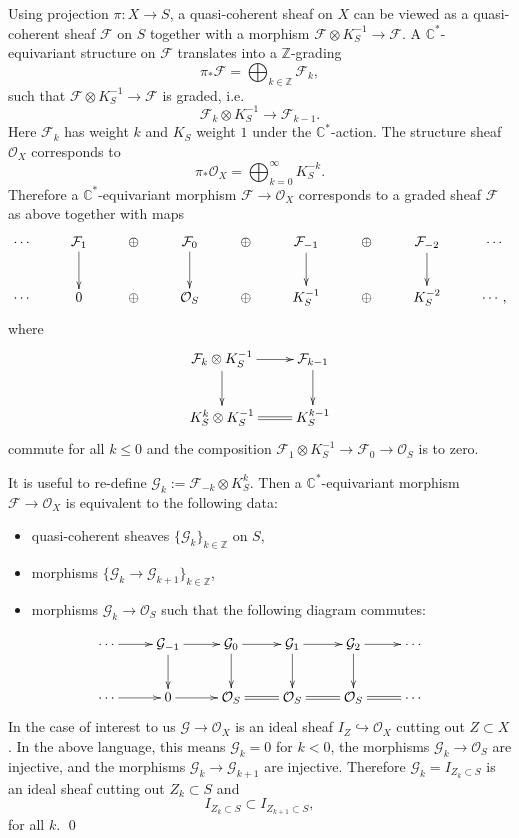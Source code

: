 \documentclass{amsart}
\theoremstyle{definition}
\newcommand{\CC} {\mathbb{C}}          %
\newcommand{\ZZ} {\mathbb{Z}}		%
\renewcommand{\O}{\mathcal{O}}
\newcommand{\F}{\mathcal{F}}
\newcommand{\G}{\mathcal{G}}
\begin{document}
\proof 
Using projection $\pi : X \rightarrow S$, a quasi-coherent sheaf on
$X$ can be viewed as a quasi-coherent sheaf $\F$ on $S$ together with
a morphism $\F \otimes K_{S}^{-1} \rightarrow \F$. A
$\CC^*$-equivariant structure on $\F$ translates into a $\ZZ$-grading
$$
\pi_* \F = \bigoplus_{k \in \ZZ} \F_k,
$$
such that $\F \otimes K_{S}^{-1} \rightarrow \F$ is graded, i.e.
$$
\F_k \otimes K_{S}^{-1} \longrightarrow \F_{k-1}.
$$
Here $\F_k$ has weight $k$ and $K_{S}$ weight $1$ under the $\CC^*$-action. The structure sheaf $\O_X$ corresponds to 
$$
\pi_* \O_X = \bigoplus_{k=0}^{\infty} K_{S}^{-k}.
$$
Therefore a $\CC^*$-equivariant morphism $\F \rightarrow \O_X$ corresponds to a graded sheaf $\F$ as above together with maps
\begin{displaymath}
\xymatrix
{
\cdots & \F_1 \ar[d] & \oplus & \F_0 \ar[d] & \oplus & \F_{-1} \ar[d] & \oplus & \F_{-2} \ar[d] & \cdots \\
\cdots &  0 & \oplus & \O_S & \oplus & K_{S}^{-1} & \oplus & K_{S}^{-2} & \cdots, 
}
\end{displaymath}
where 
\begin{displaymath}
\xymatrix
{
\F_k \otimes K_{S}^{-1} \ar[r] \ar[d] & \F_{k-1} \ar[d] \\
K_{S}^{k} \otimes K_{S}^{-1} \ar@{=}[r] & K_{S}^{k-1}
}
\end{displaymath}
commute for all $k\leq 0$ and the composition $\F_1 \otimes K_{S}^{-1} \rightarrow \F_0 \rightarrow \O_S$ is to zero. 

It is useful to re-define $\G_k := \F_{-k} \otimes K_{S}^{k}$. Then a $\CC^*$-equivariant morphism $\F \rightarrow \O_X$ is equivalent to the following data:
\begin{itemize}
\item quasi-coherent sheaves $\{\G_k\}_{k \in \ZZ}$ on $S$,
\item morphisms $\{\G_k \rightarrow \G_{k+1}\}_{k \in \ZZ}$,
\item morphisms $\G_k \rightarrow \O_S$ such that the following diagram commutes:
\end{itemize}
\begin{displaymath}
\xymatrix
{
\cdots \ar[r] & \G_{-1} \ar[d] \ar[r] & \G_0 \ar[r] \ar[d] & \G_{1} \ar[r] \ar[d] & \G_{2} \ar[r] \ar[d] & \cdots \\
\cdots \ar[r] & 0 \ar[r] & \O_S \ar@{=}[r]& \O_S \ar@{=}[r] & \O_S \ar@{=}[r] & \cdots 
}
\end{displaymath}
In the case of interest to us $\G \rightarrow \O_X$ is an ideal sheaf $I_Z \hookrightarrow \O_X$ cutting out $Z \subset X$. In the above language, this means $\G_k = 0$ for $k<0$, the morphisms $\G_k \rightarrow \O_S$ are injective, and the morphisms $\G_k \rightarrow \G_{k+1}$ are injective. Therefore $\G_k = I_{Z_k \subset S}$ is an ideal sheaf cutting out $Z_k \subset S$ and 
$$
I_{Z_k \subset S} \subset I_{Z_{k+1} \subset S},
$$
for all $k$. \qed 
\end{document}
